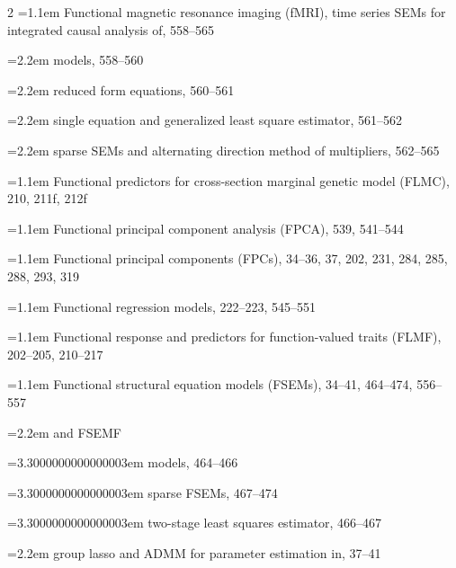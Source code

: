\begin{multicols}{2}
\noindent\hangindent=1.1em Functional magnetic resonance imaging (fMRI), time series SEMs for integrated causal analysis of, 558--565\par
\noindent\hangindent=2.2em \hspace*{1.1em}models, 558--560\par
\noindent\hangindent=2.2em \hspace*{1.1em}reduced form equations, 560--561\par
\noindent\hangindent=2.2em \hspace*{1.1em}single equation and generalized least square estimator, 561--562\par
\noindent\hangindent=2.2em \hspace*{1.1em}sparse SEMs and alternating direction method of multipliers, 562--565\par
\noindent\hangindent=1.1em Functional predictors for cross-section marginal genetic model (FLMC), 210, 211f, 212f\par
\noindent\hangindent=1.1em Functional principal component analysis (FPCA), 539, 541--544\par
\noindent\hangindent=1.1em Functional principal components (FPCs), 34--36, 37, 202, 231, 284, 285, 288, 293, 319\par
\noindent\hangindent=1.1em Functional regression models, 222--223, 545--551\par
\noindent\hangindent=1.1em Functional response and predictors for function-valued traits (FLMF), 202--205, 210--217\par
\noindent\hangindent=1.1em Functional structural equation models (FSEMs), 34--41, 464--474, 556--557\par
\noindent\hangindent=2.2em \hspace*{1.1em}and FSEMF\par
\noindent\hangindent=3.3000000000000003em \hspace*{2.2em}models, 464--466\par
\noindent\hangindent=3.3000000000000003em \hspace*{2.2em}sparse FSEMs, 467--474\par
\noindent\hangindent=3.3000000000000003em \hspace*{2.2em}two-stage least squares estimator, 466--467\par
\noindent\hangindent=2.2em \hspace*{1.1em}group lasso and ADMM for parameter estimation in, 37--41\par

\end{multicols}
